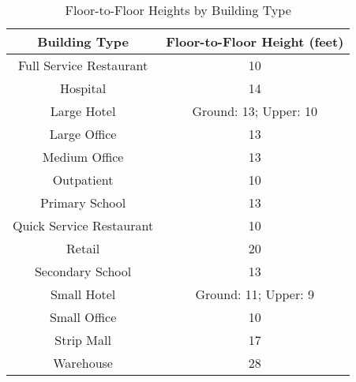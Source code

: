 \begin{table}[h]
\small
\centering
\caption[Floor-to-Floor Heights]{Floor-to-Floor Heights by Building Type}
\label{tab:floor_height}
\small
\begin{tabular}{|c|c|}
\hline
\textbf{Building Type}   & \textbf{Floor-to-Floor Height (feet)} \\ \hline
Full Service Restaurant  & 10                                    \\ \hline
Hospital                 & 14                                    \\ \hline
Large Hotel              & Ground: 13; Upper: 10                 \\ \hline
Large Office             & 13                                    \\ \hline
Medium Office            & 13                                    \\ \hline
Outpatient               & 10                                    \\ \hline
Primary School           & 13                                    \\ \hline
Quick Service Restaurant & 10                                    \\ \hline
Retail                   & 20                                    \\ \hline
Secondary School         & 13                                    \\ \hline
Small Hotel              & Ground: 11; Upper: 9                  \\ \hline
Small Office             & 10                                    \\ \hline
Strip Mall               & 17                                    \\ \hline
Warehouse                & 28                                    \\ \hline
\end{tabular}
\end{table}
